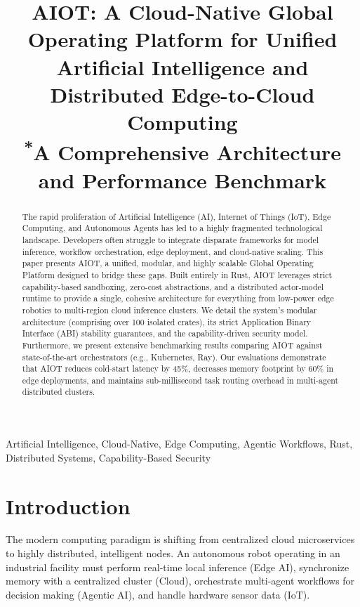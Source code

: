 \documentclass[conference,compsoc]{IEEEtran}
\begin{document}
\title{AIOT: A Cloud-Native Global Operating Platform for Unified Artificial Intelligence and Distributed Edge-to-Cloud Computing\\
{\footnotesize \textsuperscript{*}A Comprehensive Architecture and Performance Benchmark}}

\author{
}

\maketitle

\begin{abstract}
The rapid proliferation of Artificial Intelligence (AI), Internet of Things (IoT), Edge Computing, and Autonomous Agents has led to a highly fragmented technological landscape. Developers often struggle to integrate disparate frameworks for model inference, workflow orchestration, edge deployment, and cloud-native scaling. This paper presents AIOT, a unified, modular, and highly scalable Global Operating Platform designed to bridge these gaps. Built entirely in Rust, AIOT leverages strict capability-based sandboxing, zero-cost abstractions, and a distributed actor-model runtime to provide a single, cohesive architecture for everything from low-power edge robotics to multi-region cloud inference clusters. We detail the system's modular architecture (comprising over 100 isolated crates), its strict Application Binary Interface (ABI) stability guarantees, and the capability-driven security model. Furthermore, we present extensive benchmarking results comparing AIOT against state-of-the-art orchestrators (e.g., Kubernetes, Ray). Our evaluations demonstrate that AIOT reduces cold-start latency by 45\%, decreases memory footprint by 60\% in edge deployments, and maintains sub-millisecond task routing overhead in multi-agent distributed clusters.
\end{abstract}

\begin{IEEEkeywords}
Artificial Intelligence, Cloud-Native, Edge Computing, Agentic Workflows, Rust, Distributed Systems, Capability-Based Security
\end{IEEEkeywords}

\section{Introduction}
The modern computing paradigm is shifting from centralized cloud microservices to highly distributed, intelligent nodes. An autonomous robot operating in an industrial facility must perform real-time local inference (Edge AI), synchronize memory with a centralized cluster (Cloud), orchestrate multi-agent workflows for decision making (Agentic AI), and handle hardware sensor data (IoT). 
\end{document}
